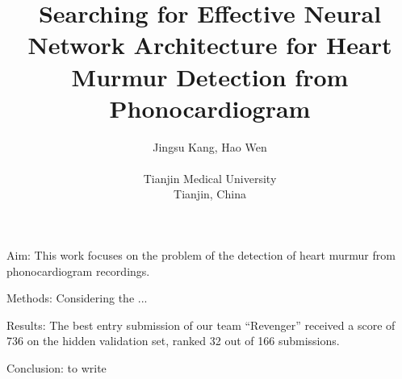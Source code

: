 \documentclass{cinc-abstract}
\begin{document}
\title{Searching for Effective Neural Network Architecture for Heart Murmur Detection from Phonocardiogram}

\author {Jingsu Kang, Hao Wen\\ %
\ \\ %
Tianjin Medical University\\  %
Tianjin, China} %

\maketitle



Aim: This work focuses on the problem of the detection of heart murmur from phonocardiogram recordings.

Methods: Considering the ...

Results: The best entry submission of our team ``Revenger'' received a score of 736 on the hidden validation set, ranked 32 out of 166 submissions.

Conclusion: to write
\end{document}
